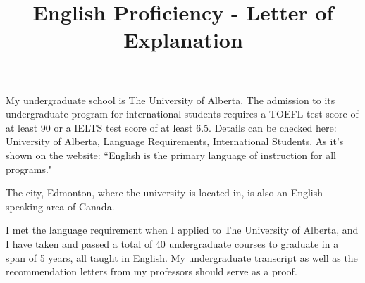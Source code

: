 \documentclass[11pt]{article}
\title{English Proficiency - Letter of Explanation}
\begin{document}
    \maketitle

    My undergraduate school is The University of Alberta.
    The admission to its undergraduate program for international students requires a TOEFL test score of at least 90 or a IELTS test score of at least 6.5.
    Details can be checked here: \href{https://www.ualberta.ca/admissions/international/admission/admission-requirements/language-requirements/index.html?}{University of Alberta, Language Requirements, International Students}.
    As it's shown on the website: ``English is the primary language of instruction for all programs."

    The city, Edmonton, where the university is located in, is also an English-speaking area of Canada.

    I met the language requirement when I applied to The University of Alberta,
    and I have taken and passed a total of 40 undergraduate courses to graduate in a span of 5 years, all taught in English.
    My undergraduate transcript as well as the recommendation letters from my professors should serve as a proof.
\end{document}
